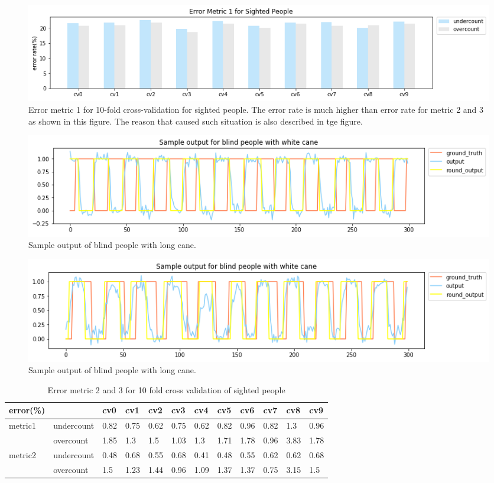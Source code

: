 \documentclass[11pt]{article}
\begin{document}
{\begin{figure}[ht]
\centering
\includegraphics[scale=0.5]{error_metric_1_na_10fold}
\caption{Error metric 1 for 10-fold cross-validation for sighted people. The error rate is much higher than error rate for metric 2 and 3 as shown in this figure. The reason that caused such situation is also described in tge figure.}
\label{fig:error_metric_1_na_10fold}
\end{figure}


\begin{figure}[ht]
\centering
\includegraphics[scale=0.5]{output_wc_1}
\caption{Sample output of blind people with long cane.}
\label{fig:output_wc_1}
\end{figure}

\begin{figure}[ht]
\centering
\includegraphics[scale=0.5]{output_wc_2}
\caption{Sample output of blind people with long cane.}
\label{fig:output_wc_2}
\end{figure}




\begin{table}[]
\centering
\caption{Error metric 2 and 3 for 10 fold cross validation of sighted people}
\label{label_metric23_sighted}
\begin{tabular}{llllllllllll}
\hline
error(\%)                &            & cv0   & cv1   & cv2   & cv3   & cv4   & cv5   & cv6   & cv7   & cv8   & cv9  \\ \hline
metric1                  & undercount & 0.82  & 0.75  & 0.62  & 0.75  & 0.62  & 0.82  & 0.96  & 0.82  & 1.3   & 0.96 \\
                         & overcount  & 1.85  & 1.3   & 1.5   & 1.03  & 1.3   & 1.71  & 1.78  & 0.96  & 3.83  & 1.78 \\ \hline
\multirow{2}{*}{metric2} & undercount & 0.48  & 0.68  & 0.55  & 0.68  & 0.41  & 0.48  & 0.55  & 0.62  & 0.62  & 0.68 \\
                         & overcount  & 1.5   & 1.23  & 1.44  & 0.96  & 1.09  & 1.37  & 1.37  & 0.75  & 3.15  & 1.5  \\ \hline
\end{tabular}
\end{table}


}
\end{document}
